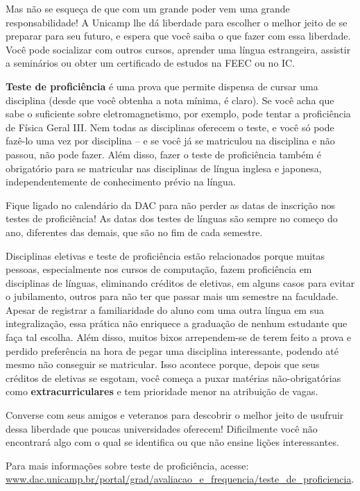 Mas não se esqueça de que com um grande poder vem uma grande responsabilidade!
A Unicamp lhe dá liberdade para escolher o melhor jeito de se preparar para seu
futuro, e espera que você saiba o que fazer com essa liberdade. Você pode
socializar com outros cursos, aprender uma língua estrangeira, assistir a
seminários ou obter um certificado de estudos na FEEC ou no IC.

\textbf{Teste de proficiência} é uma prova que permite dispensa de cursar uma
disciplina (desde que você obtenha a nota mínima, é claro). Se você acha que
sabe o suficiente sobre eletromagnetismo, por exemplo, pode tentar a
proficiência de Física Geral III.  Nem todas as disciplinas oferecem o teste, e
você só pode fazê-lo uma vez por disciplina -- e se você já se matriculou na
disciplina e não passou, não pode fazer.  Além disso, fazer o teste de
proficiência também é obrigatório para se matricular nas disciplinas de língua
inglesa e japonesa, independentemente de conhecimento prévio na língua.

Fique ligado no calendário da DAC para não perder as datas de inscrição nos
testes de proficiência! As datas dos testes de línguas são sempre no começo do
ano, diferentes das demais, que são no fim de cada semestre.

Disciplinas eletivas e teste de proficiência estão relacionados porque muitas
pessoas, especialmente nos cursos de computação, fazem proficiência em
disciplinas de línguas, eliminando créditos de eletivas, em alguns casos para
evitar o jubilamento, outros para não ter que passar mais um semestre na
faculdade. Apesar de registrar a familiaridade do aluno com uma outra língua em
sua integralização, essa prática não enriquece a graduação de nenhum estudante
que faça tal escolha. Além disso, muitos bixos arrependem-se de terem feito a
prova e perdido preferência na hora de pegar uma disciplina interessante,
podendo até mesmo não conseguir se matricular. Isso acontece porque, depois que
seus créditos de eletivas se esgotam, você começa a puxar matérias
não-obrigatórias como \textbf{extracurriculares} e tem prioridade menor na
atribuição de vagas.

Converse com seus amigos e veteranos para descobrir o melhor jeito de usufruir
dessa liberdade que poucas universidades oferecem! Dificilmente você não
encontrará algo com o qual se identifica ou que não ensine lições interessantes.

Para mais informações sobre teste de proficiência, acesse:
\url{www.dac.unicamp.br/portal/grad/avaliacao_e_frequencia/teste_de_proficiencia}.

